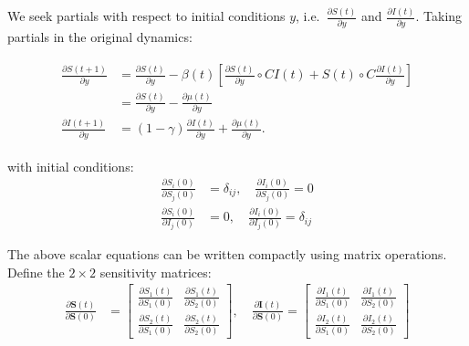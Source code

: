 We seek partials with respect to initial conditions $y$,
i.e.~$\frac{\partial S(t)}{\partial y}$ and $\frac{\partial
  I(t)}{\partial y}$. Taking partials in the original dynamics:

\begin{align}\begin{split}
  \frac{\partial S(t+1)}{\partial y} &= \frac{\partial S(t)}{\partial y} - \beta(t) \left[ \frac{\partial S(t)}{\partial y} \circ  CI(t) + S(t)\circ C \frac{\partial I(t)}{\partial y} \right] \\
  & = \frac{\partial S(t)}{\partial y} - \frac{\partial \mu(t)}{\partial y} \\
  \frac{\partial I(t+1)}{\partial y} &= (1-\gamma) \frac{\partial I(t)}{\partial y} + \frac{\partial \mu(t)}{\partial y}.
\end{split}\end{align}


with initial conditions:
\begin{align}
\frac{\partial S_i(0)}{\partial S_j(0)} &= \delta_{ij}, \quad \frac{\partial I_i(0)}{\partial S_j(0)} = 0 \\
\frac{\partial S_i(0)}{\partial I_j(0)} &= 0, \quad \frac{\partial I_i(0)}{\partial I_j(0)} = \delta_{ij}
\end{align}

The above scalar equations can be written compactly using matrix
operations. Define the $2 \times 2$ sensitivity matrices:
\begin{align}
\frac{\partial \mathbf{S}(t)}{\partial \mathbf{S}(0)} &= \begin{bmatrix} \frac{\partial S_1(t)}{\partial S_1(0)} & \frac{\partial S_1(t)}{\partial S_2(0)} \\ \frac{\partial S_2(t)}{\partial S_1(0)} & \frac{\partial S_2(t)}{\partial S_2(0)} \end{bmatrix}, \quad \frac{\partial \mathbf{I}(t)}{\partial \mathbf{S}(0)} = \begin{bmatrix} \frac{\partial I_1(t)}{\partial S_1(0)} & \frac{\partial I_1(t)}{\partial S_2(0)} \\ \frac{\partial I_2(t)}{\partial S_1(0)} & \frac{\partial I_2(t)}{\partial S_2(0)} \end{bmatrix}
\end{align}

